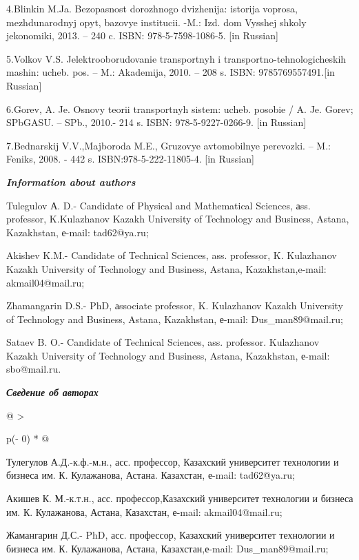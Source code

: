 4.Blinkin M.Ja. Bezopasnost\textquotesingle{} dorozhnogo dvizhenija:
istorija voprosa, mezhdunarodnyj opyt, bazovye institucii. -M.: Izd. dom
Vysshej shkoly jekonomiki, 2013. -- 240 c. ISBN: 978-5-7598-1086-5.
{[}in Russian{]}

5.Volkov V.S. Jelektrooborudovanie transportnyh i
transportno-tehnologicheskih mashin: ucheb. pos. -- M.: Akademija, 2010.
-- 208 s. ISBN: 9785769557491.{[}in Russian{]}

6.Gorev, A. Je. Osnovy teorii transportnyh sistem: ucheb. posobie / A.
Je. Gorev; SPbGASU. -- SPb., 2010.- 214 s. ISBN: 978-5-9227-0266-9.
{[}in Russian{]}

7.Bednarskij V.V.,Majboroda M.E., Gruzovye avtomobil\textquotesingle nye
perevozki. -- M.: Feniks, 2008. - 442 s. ISBN:978-5-222-11805-4. {[}in
Russian{]}

\emph{\textbf{Information about authors}}

Tulegulov А. D.- Candidate of Physical and Mathematical Sciences, аss.
professor, K.Kulazhanov Kazakh University of Technology and Business,
Astana, Kazakhstan, е-mail: tad62@ya.ru;

Akishev K.M.- Candidate of Technical Sciences, ass. professor, K.
Kulazhanov Kazakh University of Technology and Business, Astana,
Kazakhstan,e-mail: akmail04@mail.ru;

Zhamangarin D.S.- PhD, аssociate professor, K. Kulazhanov Kazakh
University of Technology and Business, Astana, Kazakhstan, е-mail:
Dus\_man89@mail.ru;

Sataev B. O.- Candidate of Technical Sciences, ass. professor.
Kulazhanov Kazakh University of Technology and Business, Astana,
Kazakhstan, е-mail: sbo@mail.ru.

\emph{\textbf{Сведение об авторах}}

\begin{longtable}[]{@{}
  >{\raggedright\arraybackslash}p{(\columnwidth - 0\tabcolsep) * }@{}}
\toprule\noalign{}
\begin{minipage}[b]{\linewidth}\raggedright
Тулегулов А.Д.-к.ф.-м.н., асс. профессор, Казахский университет
технологии и бизнеса им. К. Кулажанова, Астана. Казахстан, е-mail:
tad62@ya.ru;

Акишев К. М.-к.т.н., асс. профессор,Казахский университет технологии и
бизнеса им. К. Кулажанова, Астана, Казахстан, е-mail: akmail04@mail.ru;

Жамангарин Д.С.- PhD, асс. профессор, Казахский университет технологии и
бизнеса им. К. Кулажанова, Астана, Казахстан,е-mail: Dus\_man89@mail.ru;
\end{minipage} \\
\midrule\noalign{}
\endhead
\bottomrule\noalign{}
\endlastfoot
\end{longtable}

